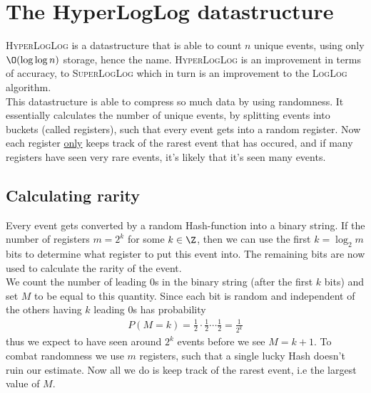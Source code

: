 \date{18/11/26}
\section{The HyperLogLog datastructure}
\textsc{HyperLogLog} is a datastructure that is able to count $n$ unique events, using only $\O(\log\log n)$ storage, hence the name. \textsc{HyperLogLog} is an improvement in terms of accuracy, to \textsc{SuperLogLog} which in turn is an improvement to the \textsc{LogLog} algorithm.
\\
This datastructure is able to compress so much data by using randomness. It essentially calculates the number of unique events, by splitting events into buckets (called registers), such that every event gets into a random register. Now each register \underline{only} keeps track of the rarest event that has occured, and if many registers have seen very rare events, it's likely that it's seen many events. 

\subsection{Calculating rarity}
Every event gets converted by a random Hash-function into a binary string. If the number of registers $m=2^k$ for some $k\in\Z$, then we can use the first $k=\log_2 m$ bits to determine what register to put this event into. The remaining bits are now used to calculate the rarity of the event.
\\
We count the number of leading 0s in the binary string (after the first $k$ bits) and set $M$ to be equal to this quantity. Since each bit is random and independent of the others having $k$ leading 0s has probability
\begin{equation*}
    \begin{split}
        P(M=k)=\frac{1}{2}\cdot \frac{1}{2}\cdots \frac{1}{2}=\frac{1}{2^k}
    \end{split}
\end{equation*}
thus we expect to have seen around $2^k$ events before we see $M=k+1$. To combat randomness we use $m$ registers, such that a single lucky Hash doesn't ruin our estimate. Now all we do is keep track of the rarest event, i.e the largest value of $M$.


